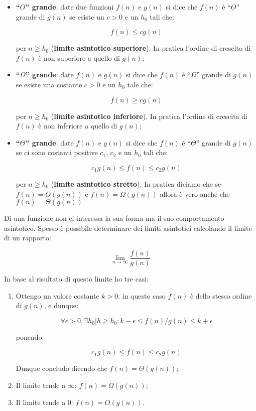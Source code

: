 \begin{itemize}

\item \textbf{``$O$'' grande}: date due funzioni $f(n)$ e $g(n)$ si dice che $f(n)$ è ``$O$'' grande di $g(n)$ se esiste un $c>0$ e un $h_0$ tali che: 

$$f(n)\le cg(n)$$ 

per $n\ge h_0$ (\textbf{limite asintotico superiore}). In pratica l'ordine di crescita di $f(n)$ è non superiore a quello di $g(n)$;

\item \textbf{``$\Omega$'' grande}: date $f(n)$ e $g(n)$ si dice che $f(n)$ è ``$\Omega$'' grande di $g(n)$ se esiste una costante $c>0$ e un $h_0$ tale che:

$$f(n)\ge cg(n)$$ 

per $n\ge h_0$ (\textbf{limite asintotico inferiore}). In pratica l'ordine di crescita di $f(n)$ è non inferiore a quello di $g(n)$;

\item \textbf{``$\Theta$'' grande}: date $f(n)$ e $g(n)$ si dice che $f(n)$ è ``$\Theta$'' grande di $g(n)$ se ci sono costanti positive $c_1$, $c_2$ e un $h_0$ tali che:

$$c_1g(n)\le f(n) \le c_2g(n)$$

per $n\ge h_0$ (\textbf{limite asintotico stretto}). In pratica diciamo che se $f(n)=O(g(n))$ e $f(n)=\Omega(g(n))$ allora è vero anche che $f(n)=\Theta(g(n))$

\end{itemize}

Di una funzione non ci interessa la sua forma ma il suo comportamento asintotico. Spesso è possibile determinare dei limiti asintotici calcolando il limite di un rapporto:

$$\lim_{n \to \infty} \frac{f(n)}{g(n)}$$

In base al risultato di questo limite ho tre casi:

\begin{enumerate}

\item Ottengo un valore costante $k>0$: in questo caso $f(n)$ è dello stesso ordine di $g(n)$, e dunque:

$$\forall \epsilon>0, \exists h_0 | h\ge h_0 : k-\epsilon \le f(n)/g(n)\le k+\epsilon$$

ponendo:

$$c_1g(n)\le f(n) \le c_2g(n)$$

Dunque concludo dicendo che $f(n)=\Theta(g(n))$;

\item Il limite tende a $\infty$: $f(n)=\Omega(g(n))$;
\item Il limite tende a $0$: $f(n)=O(g(n))$.

\end{enumerate}


